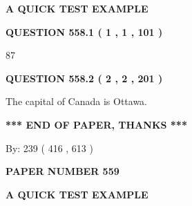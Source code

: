 \documentclass[12pt]{article}
\begin{document}
   
   
   
 \vspace{0.2in}
{\LARGE {\textbf{ A QUICK TEST EXAMPLE}}}
   
   
  
\vspace{0.2in}
  
{\textbf{\Large{QUESTION
558.1 
 ( 1 , 1 , 101 )
}}}
  
  
 
 
\noindent{}

87
 
 
  
\vspace{0.2in}
  
{\textbf{\Large{QUESTION
558.2 
 ( 2 , 2 , 201 )
}}}
  
  
 
 
\noindent{}
 
 
The capital of Canada is Ottawa.
 
 
 
 
   
   
 \vspace{0.2in}
 
   
   
   
   
\vspace{1.0in} 
{\textbf{\large{ *** END OF PAPER, THANKS *** }}} 
   
   
\hspace{1.0in} By: 
 239 ( 416 ,  613 )
   
   
   
   
\newpage 
\setcounter{page}{ 
   559001 } 
   
   
   
   
 {\textbf{ \Large{ PAPER NUMBER  559  }}}
   
   
\vspace{0.2in}
   
   
   
   
   
   
 \vspace{0.2in}
{\LARGE {\textbf{ A QUICK TEST EXAMPLE}}}
   
   
  
\vspace{0.2in}
  
\end{document}
